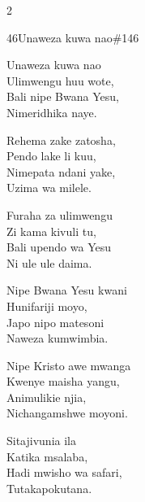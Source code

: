 \begin{multicols}{2}
\begin{hymn}{46}{Unaweza kuwa nao}{\#146}
\begin{stanza}
Unaweza kuwa nao\\
Ulimwengu huu wote,\\
Bali nipe Bwana Yesu,\\
Nimeridhika naye.
\end{stanza}
\begin{chorus}
Rehema zake zatosha,\\
Pendo lake li kuu,\\
Nimepata ndani yake,\\
Uzima wa milele.
\end{chorus}
\begin{stanza}
Furaha za ulimwengu\\
Zi kama kivuli tu,\\
Bali upendo wa Yesu\\
Ni ule ule daima.
\end{stanza}
\begin{stanza}
Nipe Bwana Yesu kwani\\
Hunifariji moyo,\\
Japo nipo matesoni\\
Naweza kumwimbia.
\end{stanza}
\begin{stanza}
Nipe Kristo awe mwanga\\
Kwenye maisha yangu,\\
Animulikie njia,\\
Nichangamshwe moyoni.
\end{stanza}
\begin{stanza}
Sitajivunia ila\\
Katika msalaba,\\
Hadi mwisho wa safari,\\
Tutakapokutana.
\end{stanza}
\end{hymn}


\end{multicols}
